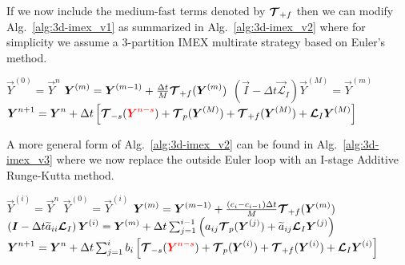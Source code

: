 \documentclass{report}
\begin{document}
If we now include the medium-fast terms denoted by $\boldsymbol{{\mathcal{T}}}_{+f}$ then we can modify Alg.\ \ref{alg:3d-imex_v1} as summarized in Alg.\ \ref{alg:3d-imex_v2} where for simplicity we assume a 3-partition IMEX multirate strategy based on Euler's method.
\begin{algorithm}
\label{alg:3d-imex_v2}
\begin{algorithmic}
\State
{}
\State $\vec{Y}^{(0)}=\vec{Y}^{n}$
\State $\boldsymbol{{Y}}^{(m)}=\boldsymbol{{Y}}^{(m-1)} + \frac{\Delta t}{M} \boldsymbol{{\mathcal{T}}}_{+f}(\boldsymbol{{Y}}^{(m)})$
\EndFor %
\State $\left( \vec{I} - \Delta t \vec{\mathcal{L}}_I \right) \vec{Y}^{(M)}=\vec{Y}^{(m)}$
\State $\boldsymbol{{Y}}^{n+1}=\boldsymbol{{Y}}^{n} + \Delta t \left[ \boldsymbol{{\mathcal{T}}}_{-s}(\textcolor{red}{\boldsymbol{{Y}}^{n-s}}) + \boldsymbol{{\mathcal{T}}}_{p}(\boldsymbol{{Y}}^{(M)}) + 
\boldsymbol{{\mathcal{T}}}_{+f}(\boldsymbol{{Y}}^{(M)}) + 
\boldsymbol{{\mathcal{L}}}_I \boldsymbol{{Y}}^{(M)} \right]$
\EndFunction
\end{algorithmic}
\end{algorithm}
A more general form of Alg.\ \ref{alg:3d-imex_v2} can be found in Alg.\ \ref{alg:3d-imex_v3} where we now replace the outside Euler loop with an I-stage Additive Runge-Kutta method. 
\begin{algorithm}
\label{alg:3d-imex_v3}
\begin{algorithmic}
\State
{}
\State $\vec{Y}^{(i)}=\vec{Y}^{n}$
\State $\vec{Y}^{(0)}=\vec{Y}^{(i)}$
\State $\boldsymbol{{Y}}^{(m)}=\boldsymbol{{Y}}^{(m-1)} + \frac{\left(c_i - c_{i-1} \right) \Delta t}{M} \boldsymbol{{\mathcal{T}}}_{+f}(\boldsymbol{{Y}}^{(m)})$
\EndFor %
\State $\left( \boldsymbol{{I}} - \Delta t \widetilde{a}_{ii} \boldsymbol{{\mathcal{L}}}_I \right) \boldsymbol{{Y}}^{(i)}=\boldsymbol{{Y}}^{(m)} + \Delta t \sum_{j=1}^{i-1} \left( a_{ij} \boldsymbol{{\mathcal{T}}}_{p}(\boldsymbol{{Y}}^{(j)}) + \widetilde{a}_{ij} \boldsymbol{{\mathcal{L}}}_I \boldsymbol{{Y}}^{(j)} \right)$
\EndFor %
\State $\boldsymbol{{Y}}^{n+1}=\boldsymbol{{Y}}^{n} + \Delta t \sum_{j=1}^{i} b_i \left[ \boldsymbol{{\mathcal{T}}}_{-s}(\textcolor{red}{\boldsymbol{{Y}}^{n-s}}) + \boldsymbol{{\mathcal{T}}}_{p}(\boldsymbol{{Y}}^{(i)}) + 
\boldsymbol{{\mathcal{T}}}_{+f}(\boldsymbol{{Y}}^{(i)}) + 
\boldsymbol{{\mathcal{L}}}_I \boldsymbol{{Y}}^{(i)} \right]$
\EndFunction
\end{algorithmic}
\end{algorithm}
\end{document}
